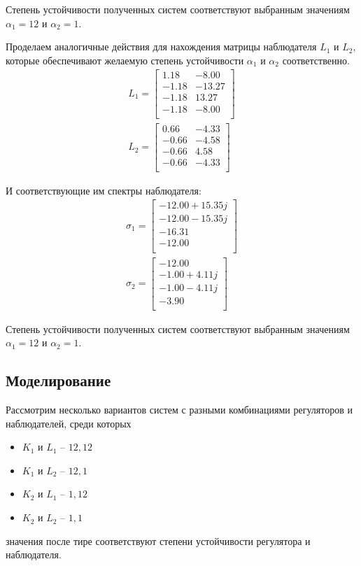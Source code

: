 Степень устойчивости полученных систем соответствуют выбранным значениям $\alpha_1 = 12$ и $\alpha_2 = 1$.

Проделаем аналогичные действия для нахождения матрицы наблюдателя $L_1$ и $L_2$, которые обеспечивают желаемую степень устойчивости $\alpha_1$ и $\alpha_2$ соответственно. 
\begin{eqnarray}
    L_1 = \begin{bmatrix}
        1.18  & -8.00 \\ 
        -1.18  & -13.27 \\ 
        -1.18  & 13.27 \\ 
        -1.18  & -8.00 \\ 
    \end{bmatrix} \\ 
    L_2 =\begin{bmatrix}
        0.66  & -4.33 \\ 
        -0.66  & -4.58 \\ 
        -0.66  & 4.58 \\ 
        -0.66  & -4.33 \\ 
        \end{bmatrix}
\end{eqnarray}

И соответствующие им спектры наблюдателя:
\begin{eqnarray}
    \sigma_1 = \begin{bmatrix}
        -12.00 + 15.35j \\ 
        -12.00 - 15.35j \\ 
        -16.31 \\ 
        -12.00 \\ 
    \end{bmatrix} \\ 
    \sigma_2 = \begin{bmatrix}
        -12.00 \\ 
        -1.00 + 4.11j \\ 
        -1.00 - 4.11j \\ 
        -3.90 \\ 
        \end{bmatrix}
\end{eqnarray}

Степень устойчивости полученных систем соответствуют выбранным значениям $\alpha_1 = 12$ и $\alpha_2 = 1$.

\subsection{Моделирование}
Рассмотрим несколько вариантов систем с разными комбинациями регуляторов и наблюдателей, среди которых 
\begin{itemize}
    \item $K_1$ и $L_1$ -- $12, 12$
    \item $K_1$ и $L_2$ -- $12, 1$
    \item $K_2$ и $L_1$ -- $1, 12$
    \item $K_2$ и $L_2$ -- $1, 1$
\end{itemize}
значения после тире соответствуют степени устойчивости регулятора и наблюдателя. 

